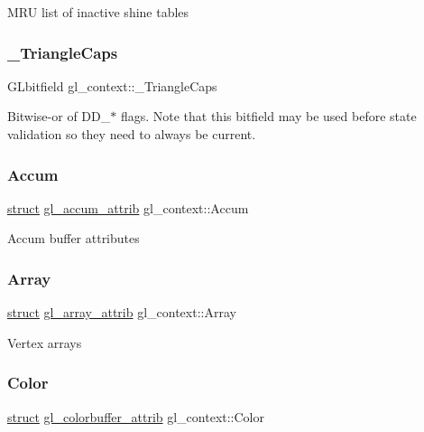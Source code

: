 M\+RU list of inactive shine tables \mbox{\label{structgl__context_a81c0ab96452f8d97b7dfe0171cef0d11}} 
\subsubsection{\texorpdfstring{\+\_\+\+Triangle\+Caps}{\_TriangleCaps}}
{\footnotesize\ttfamily G\+Lbitfield gl\+\_\+context\+::\+\_\+\+Triangle\+Caps}

Bitwise-\/or of D\+D\+\_\+$\ast$ flags. Note that this bitfield may be used before state validation so they need to always be current. \mbox{\label{structgl__context_a6d3fc098c5d88af7112008dbc571d1ef}} 
\subsubsection{\texorpdfstring{Accum}{Accum}}
{\footnotesize\ttfamily \hyperlink{interfacestruct}{struct} \hyperlink{structgl__accum__attrib}{gl\+\_\+accum\+\_\+attrib} gl\+\_\+context\+::\+Accum}

Accum buffer attributes \mbox{\label{structgl__context_a7612fcdb4163ab4dca31937f78adb826}} 
\subsubsection{\texorpdfstring{Array}{Array}}
{\footnotesize\ttfamily \hyperlink{interfacestruct}{struct} \hyperlink{structgl__array__attrib}{gl\+\_\+array\+\_\+attrib} gl\+\_\+context\+::\+Array}

Vertex arrays \mbox{\label{structgl__context_afab0d7d7836d09a81558ccf9a56e024d}} 
\subsubsection{\texorpdfstring{Color}{Color}}
{\footnotesize\ttfamily \hyperlink{interfacestruct}{struct} \hyperlink{structgl__colorbuffer__attrib}{gl\+\_\+colorbuffer\+\_\+attrib} gl\+\_\+context\+::\+Color}

